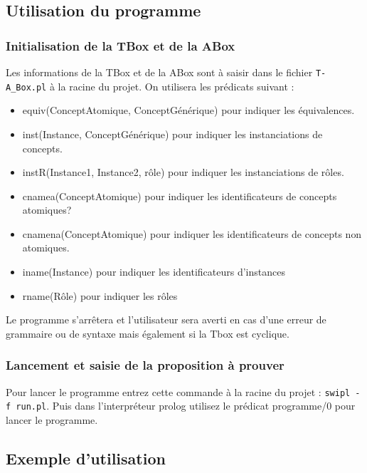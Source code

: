 \documentclass{article}
\begin{document}
\subsection{Utilisation du programme}
\subsubsection{Initialisation de la TBox et de la ABox}
Les informations de la TBox et de la ABox sont à saisir dans le fichier \verb|T-A_Box.pl| à la racine du projet. On utilisera les prédicats suivant : \begin{itemize}
    \item \color{blue} equiv(ConceptAtomique, ConceptGénérique) \color{black} pour indiquer les équivalences.
    \item \color{blue} inst(Instance, ConceptGénérique) \color{black} pour indiquer les instanciations de concepts. 
    \item \color{blue} instR(Instance1, Instance2, rôle) \color{black} pour indiquer les instanciations de rôles.
    \item \color{blue} cnamea(ConceptAtomique) \color{black} pour indiquer les identificateurs de concepts atomiques?
    \item \color{blue} cnamena(ConceptAtomique) \color{black} pour indiquer les identificateurs de concepts non atomiques.
    \item \color{blue} iname(Instance) \color{black} pour indiquer les identificateurs d'instances
    \item \color{blue} rname(Rôle) \color{black} pour indiquer les rôles
\end{itemize}
Le programme s'arrêtera et l'utilisateur sera averti en cas d'une erreur de grammaire ou de syntaxe mais également si la Tbox est cyclique.

\subsubsection{Lancement et saisie de la proposition à prouver}
Pour lancer le programme entrez cette commande à la racine du projet : \verb|swipl -f run.pl|. Puis dans l'interpréteur prolog utilisez le prédicat \color{blue} programme/0 \color{black} pour lancer le programme.


\subsection{Exemple d'utilisation}
\end{document}
